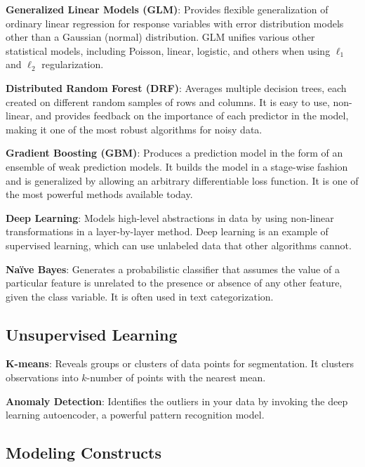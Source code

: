 {{{\textbf{Generalized Linear Models (GLM)}}: Provides flexible generalization of ordinary linear regression for response variables with error distribution models other than a Gaussian (normal) distribution. GLM unifies various other statistical models, including Poisson, linear, logistic, and others when using $\ell_1$ and $\ell_2$ regularization.

{\textbf{Distributed Random Forest (DRF)}}: Averages multiple decision trees, each created on different random samples of rows and columns. It is easy to use, non-linear, and provides feedback on the importance of each predictor in the model, making it one of the most robust algorithms for noisy data.

{\textbf{Gradient Boosting (GBM)}}: Produces a prediction model in the form of an ensemble of weak prediction models. It builds the model in a stage-wise fashion and is generalized by allowing an arbitrary differentiable loss function. It is one of the most powerful methods available today.

{\textbf{Deep Learning}}: Models high-level abstractions in data by using non-linear transformations in a layer-by-layer method. Deep learning is an example of supervised learning, which can use unlabeled data that other algorithms cannot.

{\textbf{Na\"{i}ve Bayes}}: Generates a probabilistic classifier that assumes the value of a particular feature is unrelated to the presence or absence of any other feature, given the class variable. It is often used in text categorization.

\subsection{Unsupervised Learning}

{\textbf{K-means}}: Reveals groups or clusters of data points for segmentation. It clusters observations into $k$-number of points with the nearest mean.

{\textbf{Anomaly Detection}}: Identifies the outliers in your data by invoking the deep learning autoencoder, a powerful pattern recognition model.

\subsection{Modeling Constructs}

}}
